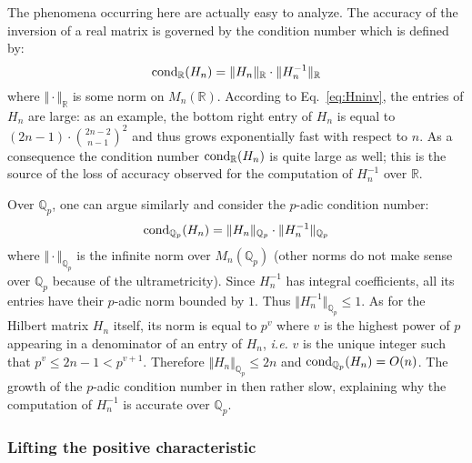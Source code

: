 \documentclass[11pt]{article}
\numberwithin{equation}{section}
\numberwithin{figure}{section}
\renewcommand{\leq}{\leqslant}
\theoremstyle{definition}
\newcommand{\Q}{\mathbb Q}
\newcommand{\Qp}{\Q_p}
\newcommand{\R}{\mathbb R}
\newcommand{\cond}{\text{\rm cond}}
\begin{document}
\medskip

The phenomena occurring here are actually easy to analyze. The accuracy
of the inversion of a real matrix is governed by the 
condition number which is defined by:
$$\cond_\R(H_n) = \Vert H_n \Vert_\R \cdot \Vert H_n^{-1} \Vert_\R$$
where $\Vert \cdot \Vert_\R$ is some norm on $M_n(\R)$. 
According to Eq.~\eqref{eq:Hninv}, the entries of $H_n$ are large: 
as an example, the bottom right entry of $H_n$ is equal to $(2n-1) \cdot 
\binom{2n-2}{n-1}^2$ and thus grows exponentially fast with respect to 
$n$. As a consequence the condition number $\cond_\R(H_n)$ is quite 
large as well; this is the source of the loss of accuracy observed
for the computation of $H_n^{-1}$ over $\R$.

Over $\Qp$, one can argue similarly and consider the 
$p$-adic condition number:
$$\cond_{\Qp}(H_n) = 
  \Vert H_n \Vert_{\Qp} \cdot \Vert H_n^{-1} \Vert_{\Qp}$$
where $\Vert \cdot \Vert_{\Qp}$ is the infinite norm over $M_n(\Qp)$
(other norms do not make sense over $\Qp$ because of the ultrametricity).
Since $H_n^{-1}$ has integral coefficients, all its entries have their
$p$-adic norm bounded by $1$. Thus $\Vert H_n^{-1} \Vert_{\Qp} \leq 1$. 
As for the Hilbert matrix $H_n$ itself, its norm is equal to $p^v$ where 
$v$ is the highest power of $p$ appearing in a denominator of an entry 
of $H_n$, \emph{i.e.} $v$ is the unique integer such that $p^v \leq 2n-1 
< p^{v+1}$. Therefore $\Vert H_n \Vert_{\Qp} \leq 2n$ and 
$\cond_{\Qp}(H_n) = O(n)$. The growth of the $p$-adic condition number 
in then rather slow, explaining why the computation of $H_n^{-1}$ is 
accurate over $\Qp$.

\subsubsection{Lifting the positive characteristic}
\label{sssec:diffeq}
\end{document}
